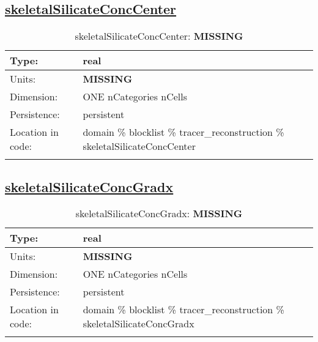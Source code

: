 \subsection[skeletalSilicateConcCenter]{\hyperref[sec:var_tab_tracer_reconstruction]{skeletalSilicateConcCenter}}
\label{subsec:var_sec_tracer_reconstruction_skeletalSilicateConcCenter}
\begin{center}
\begin{longtable}{| p{2.0in} | p{4.0in} |}
        \hline 
        Type: & real \\
        \hline 
        Units: & {\bf \color{red} MISSING} \\
        \hline 
        Dimension: & ONE nCategories nCells \\
        \hline 
        Persistence: & persistent \\
        \hline 
         Location in code: & domain \% blocklist \% tracer\_reconstruction \% skeletalSilicateConcCenter \\
         \hline 
    \caption{skeletalSilicateConcCenter: {\bf \color{red} MISSING}}
\end{longtable}
\end{center}
\subsection[skeletalSilicateConcGradx]{\hyperref[sec:var_tab_tracer_reconstruction]{skeletalSilicateConcGradx}}
\label{subsec:var_sec_tracer_reconstruction_skeletalSilicateConcGradx}
\begin{center}
\begin{longtable}{| p{2.0in} | p{4.0in} |}
        \hline 
        Type: & real \\
        \hline 
        Units: & {\bf \color{red} MISSING} \\
        \hline 
        Dimension: & ONE nCategories nCells \\
        \hline 
        Persistence: & persistent \\
        \hline 
         Location in code: & domain \% blocklist \% tracer\_reconstruction \% skeletalSilicateConcGradx \\
         \hline 
    \caption{skeletalSilicateConcGradx: {\bf \color{red} MISSING}}
\end{longtable}
\end{center}

